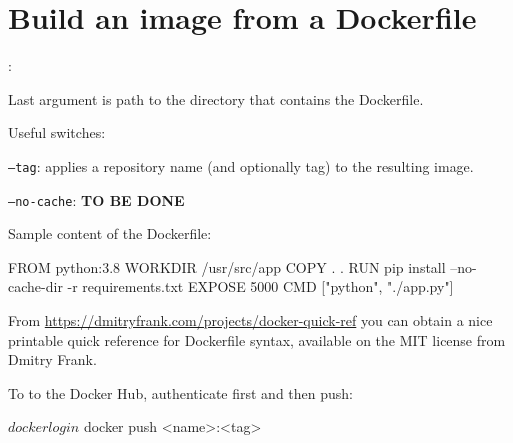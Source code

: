 \section{Build an image from a Dockerfile}
:

Last argument is path to the directory that contains the Dockerfile.

Useful switches:
\begin{compactitem}
    \item \texttt{--tag}: applies a repository name (and optionally tag) to the resulting image.
    \item \texttt{–no-cache}: \textbf{TO BE DONE}
\end{compactitem}

Sample content of the Dockerfile:
\begin{bashcode}
FROM python:3.8
WORKDIR /usr/src/app
COPY . .
RUN pip install --no-cache-dir -r requirements.txt
EXPOSE 5000
CMD ["python", "./app.py"]
\end{bashcode}

From \url{https://dmitryfrank.com/projects/docker-quick-ref} you can obtain a  nice printable quick reference for Dockerfile syntax, available on the MIT license from Dmitry Frank.

To  to the Docker Hub, authenticate first and then push:
\begin{bashcode}
$ docker login
$ docker push <name>:<tag>
\end{bashcode}

%